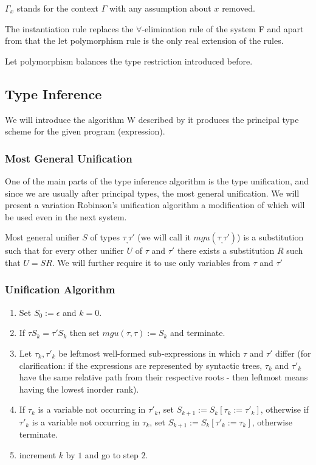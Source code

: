 $\Gamma_x$ stands for the context $\Gamma$ with any assumption about $x$ removed.

The instantiation rule replaces the $\forall$-elimination rule of the system F and apart from that the let polymorphism rule is the only real extension of the rules.

Let polymorphism balances the type restriction introduced before.

\subsection{Type Inference}

We will introduce the algorithm W described by %
it produces the principal type scheme for the given program (expression).

\subsubsection{Most General Unification}

One of the main parts of the type inference algorithm is the type unification, and since we are usually after principal types, the most general unification.
We will present a variation Robinson's unification algorithm a modification of which will be used even in the next system.

Most general unifier $S$ of types $\tau_, \tau'$ (we will call it $mgu (\tau_, \tau')$) is a substitution such that for every other unifier $U$ of $\tau$ and $\tau'$  there exists a substitution $R$ such that $U = S R$. %
We will further require it to use only variables from $\tau$ and $\tau'$

\subsubsection{Unification Algorithm}

\begin{enumerate}
    \item Set $S_0 := \epsilon$ and $k = 0$.
    \item If $\tau S_k = \tau' S_k$ then set $mgu(\tau,\tau) := S_k$ and terminate.
    \item Let $\tau_k, \tau'_k$ be leftmost well-formed sub-expressions in which $\tau$ and $\tau'$ differ (for clarification: if the expressions are represented by syntactic trees, $\tau_k$ and $\tau'_k$ have the same relative path from their respective roots - then leftmost means having the lowest inorder rank).
    \item If $\tau_k$ is a variable not occurring in $\tau'_k$, set $S_{k+1} := S_k [\tau_k := \tau'_k]$, otherwise if $\tau'_k$ is a variable not occurring in $\tau_k$, set $S_{k+1} := S_k [\tau'_k := \tau_k]$, otherwise terminate.
    \item increment $k$ by $1$ and go to step $2$.
\end{enumerate}

